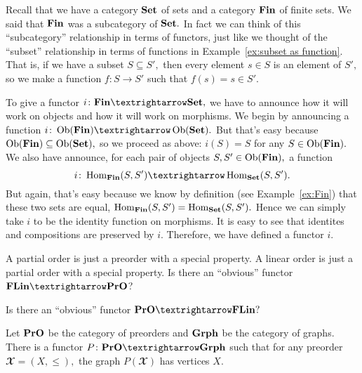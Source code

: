 \documentclass[../main/CT4S-EN-RU]{subfiles}
\begin{document}
\begin{exampleENG}
Recall that we have a category ${\mathbf{Set}}$ of sets and a category ${\mathbf{Fin}}$ of finite sets. We said that ${\mathbf{Fin}}$ was a subcategory of ${\mathbf{Set}}.$ In fact we can think of this “subcategory” relationship in terms of functors, just like we thought of the “subset” relationship in terms of functions in Example~\ref{ex:subset as function}. That is, if we have a subset $S\subseteq S',$ then every element $s\in S$ is an element of $S',$ so we make a function $f\colon S{→} S'$ such that $f(s)=s\in S'.$ 

To give a functor $i\colon\Fin{→}\Set,$ we have to announce how it will work on objects and how it will work on morphisms. We begin by announcing a function $i\colon\Ob(\Fin){→}\Ob(\Set).$ But that's easy because $\operatorname{Ob}({\mathbf{Fin}})\subseteq\operatorname{Ob}({\mathbf{Set}}),$ so we proceed as above: $i(S)=S$ for any $S\in\operatorname{Ob}({\mathbf{Fin}}).$ We also have announce, for each pair of objects $S,S'\in\operatorname{Ob}({\mathbf{Fin}}),$ a function $$i\colon\Hom_\Fin(S,S'){→}\Hom_\Set(S,S').$$ But again, that's easy because we know by definition (see Example~\ref{ex:Fin}) that these two sets are equal, $\operatorname{Hom}_{\mathbf{Fin}}(S,S')=\operatorname{Hom}_{\mathbf{Set}}(S,S').$ Hence we can simply take $i$ to be the identity function on morphisms. It is easy to see that identites and compositions are preserved by $i.$ Therefore, we have defined a functor $i.$
\end{exampleENG}

\begin{exampleRUS}
\end{exampleRUS}

\begin{exerciseENG}
A partial order is just a preorder with a special property. A linear order is just a partial order with a special property.
\sexc Is there an “obvious” functor $\FLin{→}\PrO$?
\item Is there an “obvious” functor $\PrO{→}\FLin?$
\endsexc
\end{exerciseENG}

\begin{exerciseRUS}
\end{exerciseRUS}

\begin{propositionENG}\label{prop:pro to grph}
Let ${\mathbf{PrO}}$ be the category of preorders and ${\mathbf{Grph}}$ be the category of graphs. There is a functor $P\colon\PrO{→}\Grph$ such that for any preorder ${𝓧}=(X,\leq),$ the graph $P({𝓧})$ has vertices $X.$
\end{propositionENG}
\end{document}
